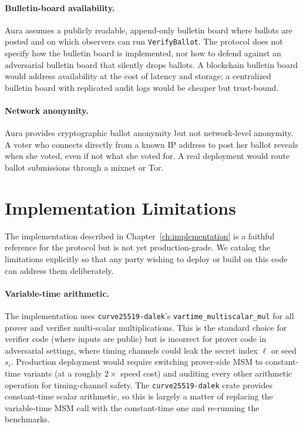 \documentclass[12pt,a4paper,oneside]{report}
\begin{document}
\paragraph{Bulletin-board availability.} 
Aura assumes a publicly readable, append-only bulletin board where 
ballots are posted and on which observers can run \texttt{VerifyBallot}. 
The protocol does not specify how the bulletin board is implemented, 
nor how to defend against an adversarial bulletin board that silently 
drops ballots. A blockchain bulletin board would address availability 
at the cost of latency and storage; a centralized bulletin board with 
replicated audit logs would be cheaper but trust-bound.

\paragraph{Network anonymity.} 
Aura provides cryptographic ballot anonymity but not network-level 
anonymity. A voter who connects directly from a known IP address to 
post her ballot reveals when she voted, even if not what she voted for. 
A real deployment would route ballot submissions through a 
mixnet or Tor.

\section{Implementation Limitations}
\label{sec:impl-limits}

The implementation described in Chapter~\ref{ch:implementation} is a 
faithful reference for the protocol but is not yet production-grade. 
We catalog the limitations explicitly so that any party wishing to 
deploy or build on this code can address them deliberately.

\paragraph{Variable-time arithmetic.} 
The implementation uses 
\texttt{curve25519-dalek}'s \texttt{vartime\_multiscalar\_mul} for all 
prover and verifier multi-scalar multiplications. This is the standard 
choice for verifier code (where inputs are public) but is incorrect 
for prover code in adversarial settings, where timing channels could 
leak the secret index $\ell$ or seed $s_i$. Production deployment 
would require switching prover-side MSM to constant-time variants 
(at a roughly $2\times$ speed cost) and auditing every other 
arithmetic operation for timing-channel safety. The 
\texttt{curve25519-dalek} crate provides constant-time scalar arithmetic, 
so this is largely a matter of replacing the variable-time MSM call 
with the constant-time one and re-running the benchmarks.
\end{document}
